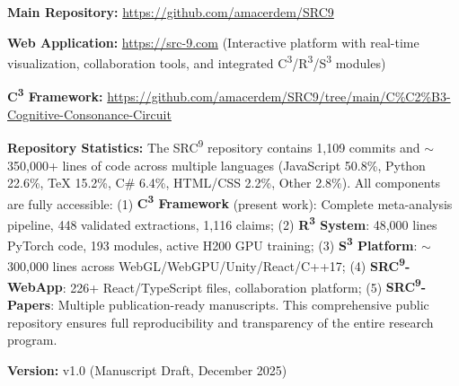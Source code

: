 \documentclass[9pt,onecolumn]{article}
\begin{document}
\textbf{Main Repository:} \url{https://github.com/amacerdem/SRC9}

\textbf{Web Application:} \url{https://src-9.com} (Interactive platform with real-time visualization, collaboration tools, and integrated C\textsuperscript{3}/R\textsuperscript{3}/S\textsuperscript{3} modules)

\textbf{C\textsuperscript{3} Framework:} \url{https://github.com/amacerdem/SRC9/tree/main/C\%C2\%B3-Cognitive-Consonance-Circuit}

\textbf{Repository Statistics:} The SRC\textsuperscript{9} repository contains 1,109 commits and $\sim$350,000+ lines of code across multiple languages (JavaScript 50.8\%, Python 22.6\%, TeX 15.2\%, C\# 6.4\%, HTML/CSS 2.2\%, Other 2.8\%). All components are fully accessible: (1) \textbf{C\textsuperscript{3} Framework} (present work): Complete meta-analysis pipeline, 448 validated extractions, 1,116 claims; (2) \textbf{R\textsuperscript{3} System}: 48,000 lines PyTorch code, 193 modules, active H200 GPU training; (3) \textbf{S\textsuperscript{3} Platform}: $\sim$300,000 lines across WebGL/WebGPU/Unity/React/C++17; (4) \textbf{SRC\textsuperscript{9}-WebApp}: 226+ React/TypeScript files, collaboration platform; (5) \textbf{SRC\textsuperscript{9}-Papers}: Multiple publication-ready manuscripts. This comprehensive public repository ensures full reproducibility and transparency of the entire research program.

\textbf{Version:} v1.0 (Manuscript Draft, December 2025)
\end{document}

